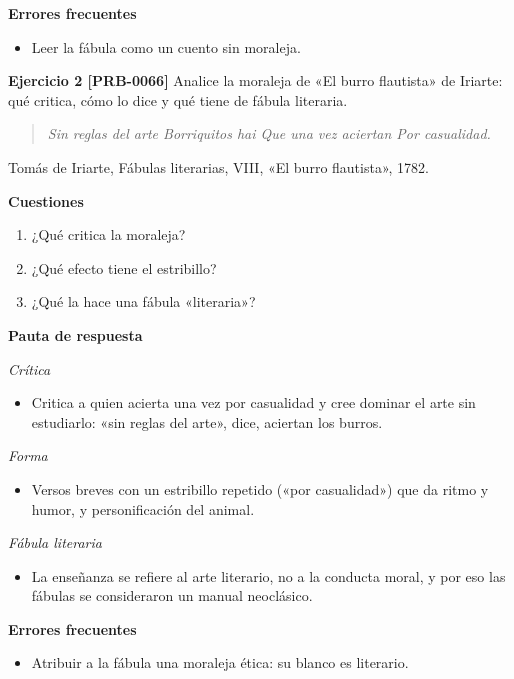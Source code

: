 \documentclass{book}
\begin{document}
\noindent\textbf{Errores frecuentes}
\begin{itemize}
\item Leer la fábula como un cuento sin moraleja.
\end{itemize}

\noindent\textbf{Ejercicio 2 [PRB-0066]}
Analice la moraleja de «El burro flautista» de Iriarte: qué critica, cómo lo dice y qué tiene de fábula literaria.


\begin{quote}
\itshape Sin reglas del arte Borriquitos hai Que una vez aciertan Por casualidad.
\end{quote}
{\noindent\footnotesize Tomás de Iriarte, Fábulas literarias, VIII, «El burro flautista», 1782.\par}

\noindent\textbf{Cuestiones}
\begin{enumerate}
\item ¿Qué critica la moraleja?
\item ¿Qué efecto tiene el estribillo?
\item ¿Qué la hace una fábula «literaria»?
\end{enumerate}

\noindent\textbf{Pauta de respuesta}

\noindent\textit{Crítica}
\begin{itemize}
\item Critica a quien acierta una vez por casualidad y cree dominar el arte sin estudiarlo: «sin reglas del arte», dice, aciertan los burros.
\end{itemize}

\noindent\textit{Forma}
\begin{itemize}
\item Versos breves con un estribillo repetido («por casualidad») que da ritmo y humor, y personificación del animal.
\end{itemize}

\noindent\textit{Fábula literaria}
\begin{itemize}
\item La enseñanza se refiere al arte literario, no a la conducta moral, y por eso las fábulas se consideraron un manual neoclásico.
\end{itemize}

\noindent\textbf{Errores frecuentes}
\begin{itemize}
\item Atribuir a la fábula una moraleja ética: su blanco es literario.
\end{itemize}
\end{document}
